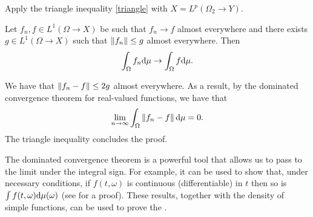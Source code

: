\documentclass[
    a4paper,
    DIV=14,
    abstract=true,
    numbers=noenddot
]{scrartcl}
\begin{document}
\begin{hint}
	Apply the triangle inequality \eqref{triangle} with $X= L^p(\Omega_2 \to Y)$.
\end{hint}
\begin{exercise}
	Let $f_n,f\in L^1(\Omega\to X)$ be such that $f_n\to f$ almost everywhere and there exists $g\in L^1(\Omega\to X)$ such that $\left\lVert f_n \right\rVert\leq g$ almost everywhere. Then
	\begin{align*}
		\int_\Omega f_n \mathrm{d}\mu\to \int_\Omega f \mathrm{d}\mu.
	\end{align*}
\end{exercise}
\begin{hint}
	We have that $\left\lVert f_n-f \right\rVert\leq 2g$ almost everywhere. As a result, by the dominated convergence theorem for real-valued functions, we have that
	\begin{align*}
		\lim_{n\to\infty}\int_\Omega\left\lVert f_n-f \right\rVert\mathrm{d}\mu=0.
	\end{align*}
	The triangle inequality concludes the proof.
\end{hint}
The dominated convergence theorem is a powerful tool that allows us to pass to the limit under the integral sign. For example, it can be used to show that, under necessary conditions, if $f(t,\omega )$ is continuous (differentiable) in $t$ then so is $\int f(t,\omega )\mathrm{d}\mu(\omega)$ (see  for a proof). These results, together with the density of simple functions, can be used to prove the .
\end{document}
